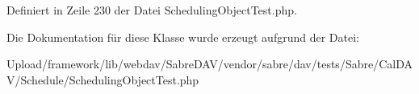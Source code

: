 Definiert in Zeile 230 der Datei Scheduling\+Object\+Test.\+php.



Die Dokumentation für diese Klasse wurde erzeugt aufgrund der Datei\+:\begin{DoxyCompactItemize}
\item 
Upload/framework/lib/webdav/\+Sabre\+D\+A\+V/vendor/sabre/dav/tests/\+Sabre/\+Cal\+D\+A\+V/\+Schedule/Scheduling\+Object\+Test.\+php\end{DoxyCompactItemize}
